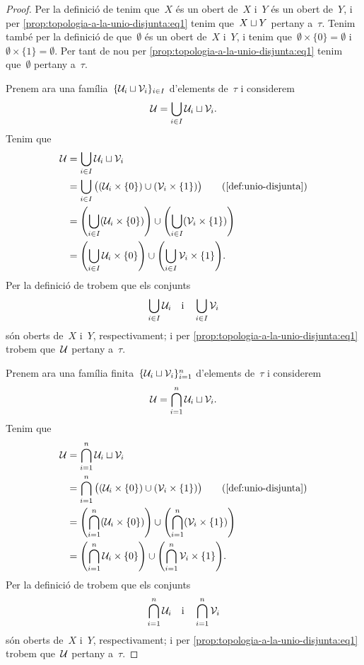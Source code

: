 \documentclass[../../main.tex]{subfiles}
\begin{document}
    \begin{proof}
        Per la definició de  tenim que~\(X\) és un obert de~\(X\) i~\(Y\) és un obert de~\(Y\), i per \eqref{prop:topologia-a-la-unio-disjunta:eq1} tenim que~\(X\mathbin{\sqcup} Y\) pertany a~\(\tau\).
        Tenim també per la definició de  que~\(\emptyset\) és un obert de~\(X\) i~\(Y\), i tenim que~\(\emptyset\times\{0\}=\emptyset\) i~\(\emptyset\times\{1\}=\emptyset\).
        Per tant de nou per \eqref{prop:topologia-a-la-unio-disjunta:eq1} tenim que~\(\emptyset\) pertany a~\(\tau\).

        Prenem ara una família~\(\{\mathcal{U}_{i}\mathbin{\sqcup}\mathcal{V}_{i}\}_{i\in I}\) d'elements de~\(\tau\) i considerem
        \[
            \mathcal{U}=\bigcup_{i\in I}\mathcal{U}_{i}\mathbin{\sqcup}\mathcal{V}_{i}.
        \]
        Tenim que
        \begin{align*}
            \obert{U}&=\bigcup_{i\in I}\obert{U}_{i}\uniodisjunta\obert{V}_{i} \\
            &=\bigcup_{i\in I}\big((\obert{U}_{i}\times\{0\})\cup(\obert{V}_{i}\times\{1\})\big) \tag{\ref{def:unio-disjunta}} \\
            &=\left(\bigcup_{i\in I}(\obert{U}_{i}\times\{0\})\right)\cup\left(\bigcup_{i\in I}(\obert{V}_{i}\times\{1\})\right) \\
            &=\left(\bigcup_{i\in I}\obert{U}_{i}\times\{0\}\right)\cup\left(\bigcup_{i\in I}\obert{V}_{i}\times\{1\}\right).
        \end{align*}
        Per la definició de  trobem que els conjunts
        \[
            \bigcup_{i\in I}\mathcal{U}_{i}\quad\text{i}\quad\bigcup_{i\in I}\mathcal{V}_{i}
        \]
        són oberts de~\(X\) i~\(Y\), respectivament; i per \eqref{prop:topologia-a-la-unio-disjunta:eq1} trobem que~\(\mathcal{U}\) pertany a~\(\tau\).

        Prenem ara una família finita~\(\{\mathcal{U}_{i}\mathbin{\sqcup}\mathcal{V}_{i}\}_{i=1}^{n}\) d'elements de~\(\tau\) i considerem
        \[
            \mathcal{U}=\bigcap_{i=1}^{n}\mathcal{U}_{i}\mathbin{\sqcup}\mathcal{V}_{i}.
        \]
        Tenim que
        \begin{align*}
            \obert{U}&=\bigcap_{i=1}^{n}\obert{U}_{i}\uniodisjunta\obert{V}_{i} \\
            &=\bigcap_{i=1}^{n}\big((\obert{U}_{i}\times\{0\})\cup(\obert{V}_{i}\times\{1\})\big) \tag{\ref{def:unio-disjunta}} \\
            &=\left(\bigcap_{i=1}^{n}(\obert{U}_{i}\times\{0\})\right)\cup\left(\bigcap_{i=1}^{n}(\obert{V}_{i}\times\{1\})\right) \\
            &=\left(\bigcap_{i=1}^{n}\obert{U}_{i}\times\{0\}\right)\cup\left(\bigcap_{i=1}^{n}\obert{V}_{i}\times\{1\}\right).
        \end{align*}
        Per la definició de  trobem que els conjunts
        \[
            \bigcap_{i=1}^{n}\mathcal{U}_{i}\quad\text{i}\quad\bigcap_{i=1}^{n}\mathcal{V}_{i}
        \]
        són oberts de~\(X\) i~\(Y\), respectivament; i per \eqref{prop:topologia-a-la-unio-disjunta:eq1} trobem que~\(\mathcal{U}\) pertany a~\(\tau\).


\end{proof}
\end{document}
